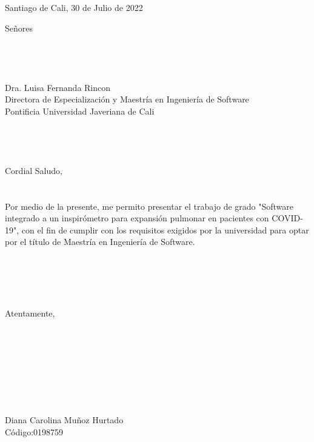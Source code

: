 \begin{flushright}
Santiago de Cali, 30 de Julio de 2022
\end{flushright}
Señores
\\
\\
\\
\\
\\
Dra. Luisa Fernanda Rincon\\
Directora de Especialización y Maestría en Ingeniería de Software\\
Pontificia Universidad Javeriana de Cali\\
\\
\\
\\
\\
Cordial Saludo,\\\\\\

Por medio de la presente, me permito presentar el trabajo de grado "Software integrado a un inspirómetro para expansión pulmonar
en pacientes con COVID-19", con el fin de cumplir con los requisitos exigidos por la universidad para optar por el título de Maestría en Ingeniería de Software.\\
\\
\\
\\
\\
\\
Atentamente,\\\\\\
\\
\\
\\
\\
\\
\\
Diana Carolina Muñoz Hurtado \qquad \qquad \\
Código:0198759 \qquad \qquad \qquad \qquad 
\newpage